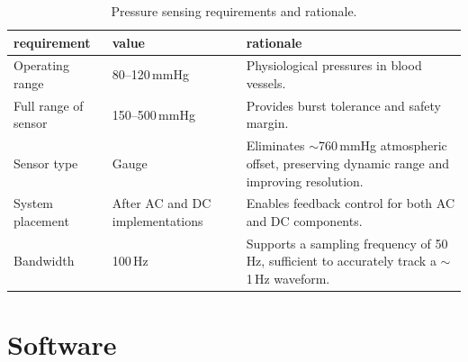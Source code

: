 \documentclass[10pt, a4paper]{article}
\begin{document}
\begin{table}[h]
    \small
    \centering
    \begin{tabularx}{\linewidth}{>{\raggedright\arraybackslash}p{4cm} p{3cm} X}
        \toprule
        \textbf{requirement} & \textbf{value}                                                                                    & \textbf{rationale} \\
        \midrule

        Operating range
                             & 80--120\,mmHg
                             & Physiological pressures in blood vessels.                                                                              \\

        Full range of sensor
                             & 150--500\,mmHg
                             & Provides burst tolerance and safety margin.                                                                            \\

        Sensor type
                             & Gauge
                             & Eliminates $\sim$760\,mmHg atmospheric offset, preserving dynamic range and improving resolution.                      \\

        System placement
                             & After AC and DC implementations
                             & Enables feedback control for both AC and DC components.                                                                \\

        Bandwidth
                             & 100\,Hz
                             & Supports a sampling frequency of 50\,Hz, sufficient to accurately track a $\sim$1\,Hz waveform.                        \\

        \bottomrule
    \end{tabularx}
    \caption{Pressure sensing requirements and rationale.}
\end{table}

\section{Software}
\end{document}
